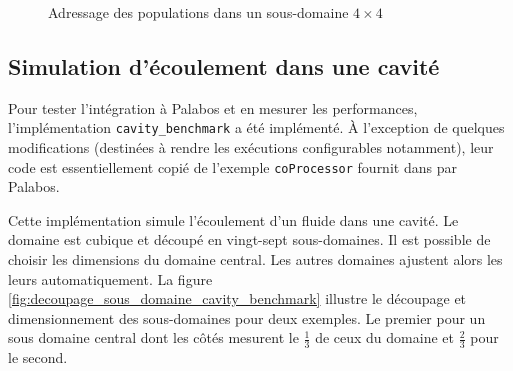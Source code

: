 \begin{figure}[h]
{		\label{fig:cp_index_z_0}
	}
	\caption{Adressage des populations dans un sous-domaine $4\times4$}
	\label{fig:adressage_cp}
\end{figure}

\subsection{Simulation d'écoulement dans une cavité} \label{title-cavity_benchmark}
Pour tester l'intégration à Palabos et en mesurer les performances, l'implémentation \texttt{cavity\_benchmark} a été implémenté. À l'exception de quelques modifications (destinées à rendre les exécutions configurables notamment), leur code est essentiellement copié de l'exemple \texttt{coProcessor} fournit dans par Palabos.

Cette implémentation simule l'écoulement d'un fluide dans une cavité. Le domaine est cubique et découpé en vingt-sept sous-domaines. Il est possible de choisir les dimensions du domaine central. Les autres domaines ajustent alors les leurs automatiquement. La figure \ref{fig:decoupage_sous_domaine_cavity_benchmark} illustre le découpage et dimensionnement des sous-domaines pour deux exemples. Le premier pour un sous domaine central dont les côtés mesurent le $\frac{1}{3}$ de ceux du domaine et  $\frac{2}{3}$ pour le second.

